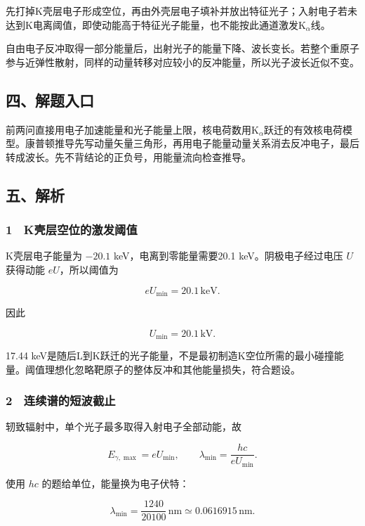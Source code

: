 \documentclass[12pt,a4paper,fontset=fandol]{ctexart}
\begin{document}
先打掉K壳层电子形成空位，再由外壳层电子填补并放出特征光子；入射电子若未达到K电离阈值，即使动能高于特征光子能量，也不能按此通道激发K\(_\alpha\)线。

自由电子反冲取得一部分能量后，出射光子的能量下降、波长变长。若整个重原子参与近弹性散射，同样的动量转移对应较小的反冲能量，所以光子波长近似不变。

\subsection{四、解题入口}\label{ux56dbux89e3ux9898ux5165ux53e3-7}

前两问直接用电子加速能量和光子能量上限，核电荷数用K\(_\alpha\)跃迁的有效核电荷模型。康普顿推导先写动量矢量三角形，再用电子能量动量关系消去反冲电子，最后转成波长。先不背结论的正负号，用能量流向检查推导。

\subsection{五、解析}\label{ux4e94ux89e3ux6790-7}

\subsubsection{1　K壳层空位的激发阈值}\label{kux58f3ux5c42ux7a7aux4f4dux7684ux6fc0ux53d1ux9608ux503c}

K壳层电子能量为 \(-20.1\) keV，电离到零能量需要20.1
keV。阴极电子经过电压 \(U\) 获得动能 \(eU\)，所以阈值为

\[eU_{\min}=20.1\,\mathrm{keV}.\]

因此

\[\boxed{U_{\min}=20.1\,\mathrm{kV}.}\]

17.44
keV是随后L到K跃迁的光子能量，不是最初制造K空位所需的最小碰撞能量。阈值理想化忽略靶原子的整体反冲和其他能量损失，符合题设。

\subsubsection{2　连续谱的短波截止}\label{ux8fdeux7eedux8c31ux7684ux77edux6ce2ux622aux6b62}

轫致辐射中，单个光子最多取得入射电子全部动能，故

\[E_{\gamma,\max}=eU_{\min},\qquad
\lambda_{\min}=\frac{hc}{eU_{\min}}.\]

使用 \(hc\) 的题给单位，能量换为电子伏特：

\[\lambda_{\min}=\frac{1240}{20100}\,\mathrm{nm}
\simeq0.0616915\,\mathrm{nm}.\]
\end{document}
